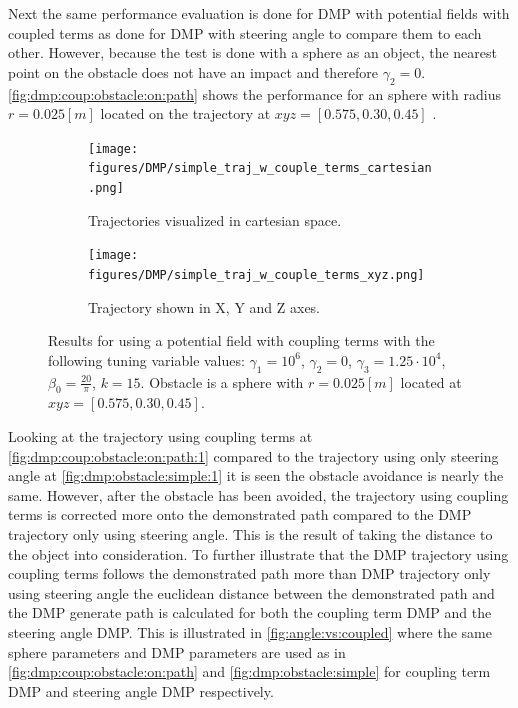 \documentclass[../main.tex]{subfiles}
\begin{document}
Next the same performance evaluation is done for DMP with potential fields with coupled terms as done for DMP with steering angle to compare them to each other. However, because the test is done with a sphere as an object, the nearest point on the obstacle does not have an impact and therefore $\gamma_2=0$. \autoref{fig:dmp:coup:obstacle:on:path} shows the performance for an sphere with radius $r=0.025[m]$ located on the trajectory at $xyz=[0.575, 0.30, 0.45]$ . 

\begin{figure}[H]
    \centering
    \begin{subfigure}[b]{0.48\textwidth}
        \centering
        \texttt{[image: figures/DMP/simple\_traj\_w\_couple\_terms\_cartesian.png]}
        \caption{Trajectories visualized in cartesian space.}
        \label{fig:dmp:coup:obstacle:on:path:1}
    \end{subfigure}
    \hfill
    \begin{subfigure}[b]{0.48\textwidth}
        \centering
        \texttt{[image: figures/DMP/simple\_traj\_w\_couple\_terms\_xyz.png]}
        \caption{Trajectory shown in X, Y and Z axes.}
        \label{fig:dmp:coup:obstacle:on:path:2}
    \end{subfigure}
    \caption{Results for using a potential field with coupling terms with the following tuning variable values: $\gamma_1 = 10^6$,  $\gamma_2=0$, $\gamma_3=1.25\cdot10^4$, $\beta_0 = \frac{20}{\pi}$, $k=15$. Obstacle is a sphere with $r=0.025[m]$ located at  $xyz=[0.575, 0.30, 0.45]$.}
    \label{fig:dmp:coup:obstacle:on:path}
\end{figure}

Looking at the trajectory using coupling terms at \autoref{fig:dmp:coup:obstacle:on:path:1} compared to the trajectory using only steering angle at \autoref{fig:dmp:obstacle:simple:1} it is seen the obstacle avoidance is nearly the same. However, after the obstacle has been avoided, the trajectory using coupling terms is corrected more onto the demonstrated path compared to the DMP trajectory only using steering angle. This is the result of taking the distance to the object into consideration. To further illustrate that the DMP trajectory using coupling terms follows the demonstrated path more than DMP trajectory only using steering angle the euclidean distance between the demonstrated path and the DMP generate path is calculated for both the coupling term DMP and the steering angle DMP. This is illustrated in \autoref{fig:angle:vs:coupled} where the same sphere parameters and DMP parameters are used as in \autoref{fig:dmp:coup:obstacle:on:path} and \autoref{fig:dmp:obstacle:simple} for coupling term DMP and steering angle DMP respectively. 
\end{document}
